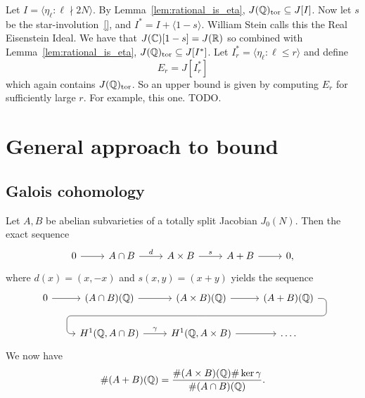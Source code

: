 \documentclass[11pt, proquest]{uwthesis}
\begin{document}
Let $I= \langle \eta_\ell:\ell\nmid 2N \rangle$. By
Lemma~\ref{lem:rational_is_eta}, $J(\mathbb{Q})_{\mathrm{tor}}\subseteq J[I]$. Now let $s$ be
the star-involution~\ref{}, and $I^*=I + \langle 1-s \rangle$. William Stein
calls this the Real Eisenstein Ideal. We have that $J(\mathbb{C})[1-s]=J(\mathbb{R})$ so
combined with Lemma~\ref{lem:rational_is_eta}, $J(\mathbb{Q})_{\mathrm{tor}}\subseteq
J[I^*]$. Let $I_r ^* = \langle \eta_\ell:\ell\leq r \rangle$ and define
\begin{equation}%
    \label{eq:stein_eta_group}
    E_r = J[I_r ^*]
\end{equation}
which again contains $J(\mathbb{Q})_{\mathrm{tor}}$. So an upper bound is given by computing
$E_r$ for sufficiently large $r$. For example, this one. TODO.

\section{General approach to bound}%
\label{sec:galois_cohomology_bounds}

\subsection{Galois cohomology}%
\label{sub:galois_cohomology}


Let $A, B$ be abelian subvarieties of a totally split Jacobian $J_0(N)$. Then
the exact sequence
\begin{equation}%
    \label{eq:ses_ab}
    \begin{tikzcd}
        0 \arrow[r] &
        A\cap B \arrow[r,"d"] &
        A\times B \arrow[r,"s"] &
        A+B \arrow[r] &
        0,
    \end{tikzcd}
\end{equation}
where $d(x)=(x,-x)$ and $s(x,y)=(x+y)$ yields the sequence
\begin{equation}%
    \label{eq:les_ab}
    \begin{tikzcd}
        0 \rar 
        &
        (A\cap B)(\QQ) \rar 
        &
        (A\times B)(\QQ) \rar
        \arrow[phantom, ""{coordinate, name=W}]{d}
        &
        (A+B)(\QQ)
        \arrow[
        rounded corners,
        to path={%
            -- ([xshift=2ex]\tikztostart.east)
            |- (W) [near end]\tikztonodes
            -| ([xshift=-2ex]\tikztotarget.west)
            -- (\tikztotarget)
        }
        ]{dll} \\
        &
        H^1(\QQ,A\cap B) \rar["\gamma"] 
        &
        H^1(\QQ,A\times B) \rar 
        & \ldots.
    \end{tikzcd}
\end{equation}
We now have
\begin{equation}%
    \label{eq:galois_cohomology_order}
    \# (A+B)(\QQ) =
    \frac{\# (A\times B)(\QQ) \# \ker\gamma}{\# (A\cap B)(\QQ)}.
\end{equation}
\end{document}
